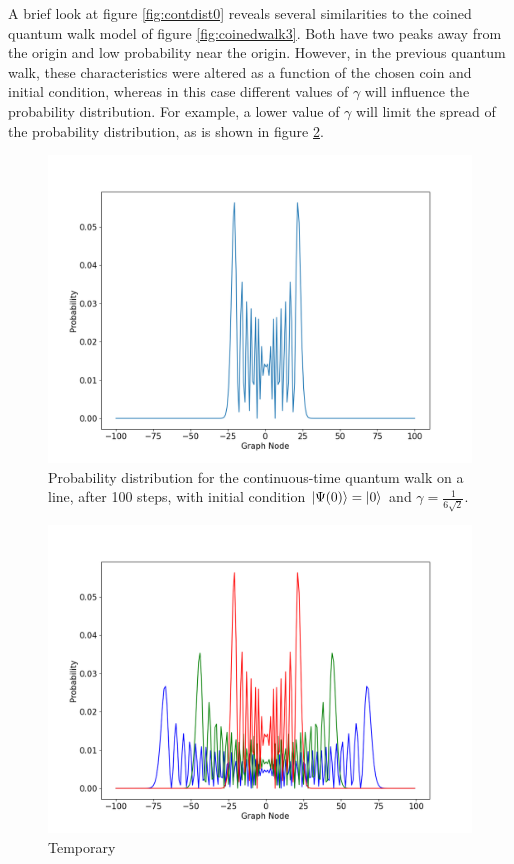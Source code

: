 \documentclass[../../dissertation.tex]{subfiles}
\begin{document}
A brief look at figure \ref{fig:contdist0} reveals several similarities to the coined quantum walk model of figure \ref{fig:coinedwalk3}. Both have two peaks away from the origin and low probability near the origin.
However, in the previous quantum walk, these characteristics were altered as a function of the chosen coin and initial condition, whereas in this case different values of $\gamma$ will influence the probability distribution. For example, a lower value of $\gamma$ will limit the spread of the probability distribution, as is shown in figure \ref{fig:contdist1}. 
\begin{figure}[!h]
	\centering
	\includegraphics[scale=0.40]{img/ContQuantumWalk/ctqwSinglePsi0LowerGamma.png}
	\caption{Probability distribution for the continuous-time quantum walk on a line, after 100 steps, with initial condition $\ket{\Psi(0)}=\ket{0}$ and $\gamma=\frac{1}{6\sqrt{2}}$.} 
	\label{fig:contdist1}
\end{figure}

\begin{figure}[!h]
	\centering
	\includegraphics[scale=0.40]{img/ContQuantumWalk/ctqwMultipleGamma.png}
	\caption{Temporary} 
	\label{fig:contdist1}
\end{figure}
\end{document}

